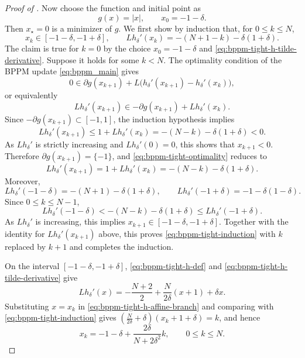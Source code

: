 \documentclass{article}
\theoremstyle{definition}
\theoremstyle{plain}
\newcommand{\bregprox}{g}
\begin{document}
\begin{proof}[Proof of ]
Now choose the function and initial point as
\[
    \bregprox(x)=|x|,
    \qquad
    x_0=-1-\delta.
\]
Then $x_\star=0$ is a minimizer of $\bregprox$.
We first show by induction that, for $0\le k\le N$,
\begin{equation}
    x_k\in[-1-\delta,-1+\delta],
    \qquad
    Lh_\delta'(x_k)=-(N+1-k)-\delta(1+\delta).
    \label{eq:bppm-tight-induction}
\end{equation}
The claim is true for $k=0$ by the choice $x_0=-1-\delta$ and \eqref{eq:bppm-tight-h-tilde-derivative}.
Suppose it holds for some $k<N$.
The optimality condition of the BPPM update \eqref{eq:bppm_main} gives
\begin{equation*}
    0\in \partial\bregprox(x_{k+1})
    +L\bigl(h_\delta'(x_{k+1})-h_\delta'(x_k)\bigr),
\end{equation*}
or equivalently
\begin{equation}
    Lh_\delta'(x_{k+1})
    \in
    -\partial\bregprox(x_{k+1})+Lh_\delta'(x_k).
    \label{eq:bppm-tight-optimality}
\end{equation}
Since $-\partial\bregprox(x_{k+1})\subset[-1,1]$, the induction hypothesis implies
\[
    Lh_\delta'(x_{k+1})
    \le
    1+Lh_\delta'(x_k)
    =-(N-k)-\delta(1+\delta)
    <0.
\]
As $Lh_\delta'$ is strictly increasing and $Lh_\delta'(0)=0$, this shows that $x_{k+1}<0$.
Therefore $\partial\bregprox(x_{k+1})=\{-1\}$, and \eqref{eq:bppm-tight-optimality} reduces to
\[
    Lh_\delta'(x_{k+1})
    =
    1+Lh_\delta'(x_k)
    =
    -(N-k)-\delta(1+\delta).
\]
Moreover,
\[
    Lh_\delta'(-1-\delta)=-(N+1)-\delta(1+\delta),
    \qquad
    Lh_\delta'(-1+\delta)=-1-\delta(1-\delta).
\]
Since $0\le k\le N-1$,
\[
    Lh_\delta'(-1-\delta)
    <
    -(N-k)-\delta(1+\delta)
    \le
    Lh_\delta'(-1+\delta).
\]
As $Lh_\delta'$ is increasing, this implies $x_{k+1}\in[-1-\delta,-1+\delta]$.
Together with the identity for $Lh_\delta'(x_{k+1})$ above, this proves \eqref{eq:bppm-tight-induction} with $k$ replaced by $k+1$ and completes the induction.

On the interval $[-1-\delta,-1+\delta]$, \eqref{eq:bppm-tight-h-def} and \eqref{eq:bppm-tight-h-tilde-derivative} give
\begin{equation}
    Lh_\delta'(x)
    =
    -\frac{N+2}{2}+\frac{N}{2\delta}(x+1)+\delta x.
    \label{eq:bppm-tight-h-affine-branch}
\end{equation}
Substituting $x=x_k$ in \eqref{eq:bppm-tight-h-affine-branch} and comparing with \eqref{eq:bppm-tight-induction} gives $\left(\frac{N}{2\delta}+\delta\right)(x_k+1+\delta)=k$, and hence
\begin{equation}
    x_k=-1-\delta+\frac{2\delta}{N+2\delta^2}k,
    \qquad 0\le k\le N.
    \label{eq:bppm-tight-trajectory}
\end{equation}


\end{proof}
\end{document}
